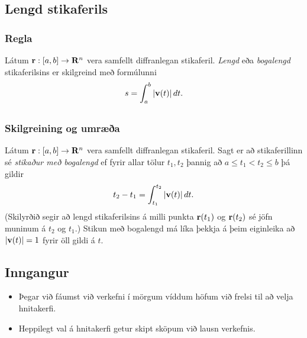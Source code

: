 % 
 



\subsection{Lengd stikaferils}
\subsubsection{Regla }
Látum $\mbox{${\bf r}$}:  [a,b]\rightarrow \mbox{${\bf R}^n$}$ vera samfellt diffranlegan stikaferil.  {\em Lengd} eða 
{\em bogalengd} stikaferilsins er skilgreind með formúlunni 
$$s=\int_a^b |\mbox{${\bf v}$}(t)|\,dt.$$



\subsection{}

\subsubsection{Skilgreining og umræða }
Látum $\mbox{${\bf r}$}: [a,b]\rightarrow \mbox{${\bf R}^n$}$ vera samfellt diffranlegan stikaferil.   Sagt er að
stikaferillinn sé {\em stikaður með  bogalengd} ef fyrir allar tölur $t_1,
t_2$ þannig að $a\leq t_1<t_2\leq b$ þá gildir 
$$t_2-t_1= \int_{t_1}^{t_2} |\mbox{${\bf v}$}(t)|\,dt.$$
(Skilyrðið segir að lengd stikaferilsins á milli punkta $\mbox{${\bf r}$}(t_1)$ og
$\mbox{${\bf r}$}(t_2)$ sé jöfn muninum á $t_2$ og $t_1$.)
Stikun með bogalengd má líka þekkja á þeim eiginleika að $|\mbox{${\bf v}$}(t)|=1$ fyrir öll gildi á $t$.






\subsection{Inngangur}
 \begin {itemize}
  \item Þegar við fáumst við verkefni í mörgum víddum höfum við frelsi til að velja hnitakerfi.
  \item Heppilegt val á hnitakerfi getur skipt sköpum við lausn verkefnis.
 \end {itemize}




